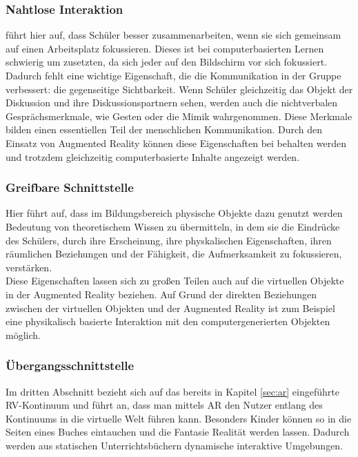 \subsubsection{Nahtlose Interaktion}
\citeauthor{billinghurst:ar-in-education} führt hier auf, dass Schüler besser zusammenarbeiten, wenn sie sich gemeinsam auf einen Arbeitsplatz fokussieren. Dieses ist bei computerbasierten Lernen schwierig um zusetzten, da sich jeder auf den Bildschirm vor sich fokussiert. Dadurch fehlt eine wichtige Eigenschaft, die die Kommunikation in der Gruppe verbessert: die gegenseitige Sichtbarkeit. Wenn Schüler gleichzeitig das Objekt der Diskussion und ihre Diskussionspartnern sehen, werden auch die nichtverbalen Gesprächsmerkmale, wie Gesten oder die Mimik wahrgenommen. Diese Merkmale bilden einen essentiellen Teil der menschlichen Kommunikation. 
Durch den Einsatz von Augmented Reality können diese Eigenschaften bei behalten werden und trotzdem gleichzeitig computerbasierte Inhalte angezeigt werden. \citep[S. 2-3]{billinghurst:ar-in-education}

\subsubsection{Greifbare Schnittstelle}
Hier führt \citeauthor{billinghurst:ar-in-education} auf, dass im Bildungsbereich physische Objekte dazu genutzt werden Bedeutung von theoretischem Wissen zu übermitteln, in dem sie die Eindrücke des Schülers, durch ihre Erscheinung, ihre physkalischen Eigenschaften, ihren räumlichen Beziehungen und der Fähigkeit, die Aufmerksamkeit zu fokussieren, verstärken.\\
Diese Eigenschaften lassen sich zu großen Teilen auch auf die virtuellen Objekte in der Augmented Reality beziehen. Auf Grund der direkten Beziehungen zwischen der virtuellen Objekten und der Augmented Reality ist zum Beispiel eine physikalisch basierte Interaktion mit den computergenerierten Objekten möglich. \citep[S. 3]{billinghurst:ar-in-education}

\subsubsection{Übergangsschnittstelle}
Im dritten Abschnitt bezieht sich \citeauthor{billinghurst:ar-in-education} auf das bereits in Kapitel \ref{sec:ar} eingeführte RV-Kontinuum und führt an, dass man mittels AR den Nutzer entlang des Kontinuums in die virtuelle Welt führen kann. Besonders Kinder können so in die Seiten eines Buches eintauchen und die Fantasie Realität werden lassen. Dadurch werden aus statischen Unterrichtsbüchern dynamische interaktive Umgebungen. \citep[S. 3-4]{billinghurst:ar-in-education}


